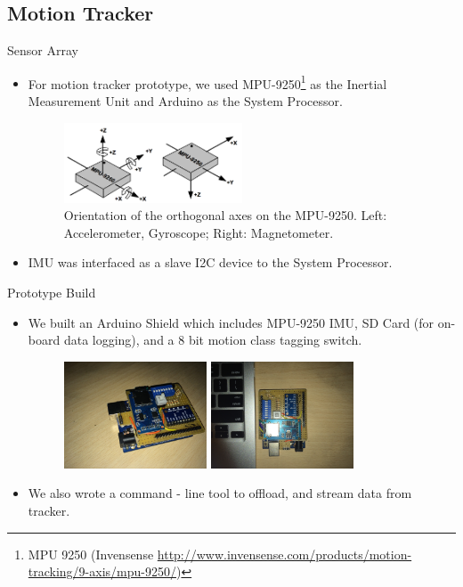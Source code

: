 \documentclass{beamer}
\begin{document}
\subsection{Motion Tracker}
\begin{frame}{Sensor Array}
  \begin{itemize}
  \item{
    For motion tracker prototype, we used MPU-9250\footnote{MPU 9250 (Invensense \url{http://www.invensense.com/products/motion-tracking/9-axis/mpu-9250/})} as the Inertial Measurement Unit and Arduino as the System Processor.
    \begin{figure}[h]
    \centering
    \includegraphics[width=0.5\textwidth]{axes_MPU9250.png}
    \caption{Orientation of the orthogonal axes on the MPU-9250. Left: Accelerometer, Gyroscope; Right: Magnetometer.}
    \end{figure}
  }
  \item{
    IMU was interfaced as a slave I2C device to the System Processor.
  }
  \end{itemize}
\end{frame}
\begin{frame}{Prototype Build}
  \begin{itemize}
  \item{
    We built an Arduino Shield which includes MPU-9250 IMU, SD Card (for on-board data logging), and a 8 bit motion class tagging switch.
    \begin{figure}[h]
      \centering
      \includegraphics[width=0.4\textwidth]{IMG_2718.jpg}
      \includegraphics[width=0.4\textwidth]{IMG_2720.jpg}
    \end{figure}
  }
  \item{
    We also wrote a command - line tool to offload, and stream data from tracker.
  }
  \end{itemize}
\end{frame}
\end{document}

